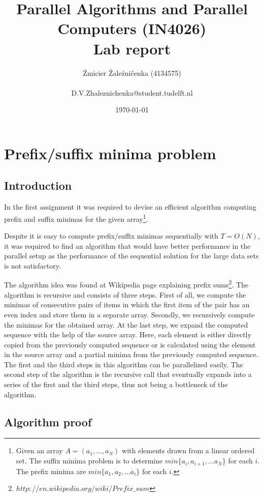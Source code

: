 \documentclass[a4paper,10pt,notitlepage]{article}
\title{Parallel Algorithms and Parallel Computers (IN4026) \\ Lab report}
\author{Źmicier Žaleźničenka (4134575) \\ \\
D.V.Zhaleznichenka@student.tudelft.nl}
\date{\today}
\begin{document}
\maketitle

\section{Prefix/suffix minima problem}

\subsection{Introduction}

In the first assignment it was required to devise an efficient algorithm computing prefix and suffix minimas for the given array\footnote{Given an array \(A = (a_1, . . . , a_N)\) with elements drawn from a linear ordered set. The suffix minima problem is to determine \(min\{a_i, a_{i+1}, . . . a_N\}\) for each $i$. The prefix minima are \(min\{a_1, a_2, . . . a_i\}\) for each $i$.}. 

Despite it is easy to compute prefix/suffix minimas sequentially with \(T = O(N)\), it was required to find an algorithm that would have better performance in the parallel setup as the performance of the sequential solution for the large data sets is not satisfactory.

The algorithm idea was found at Wikipedia page explaining prefix sums\footnote{$http://en.wikipedia.org/wiki/Prefix\_sum$}. The algorithm is recursive and consists of three steps. First of all, we compute the minimas of consecutive pairs of items in which the first item of the pair has an even index and store them in a separate array. Secondly, we recursively compute the minimas for the obtained array. At the last step, we expand the computed sequence with the help of the source array. Here, each element is either directly copied from the previously computed sequence or is calculated using the element in the source array and a partial minima from the previously computed sequence. The first and the third steps in this algorithm can be parallelized easily. The second step of the algorithm is the recursive call that eventually expands into a series of the first and the third steps, thus not being a bottleneck of the algorithm. 

\subsection{Algorithm proof}
\end{document}
